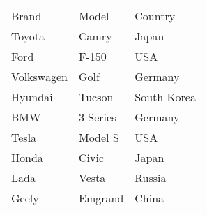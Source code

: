 \documentclass{article}
\begin{document}
\begin{tabular}{lll}
    Brand & Model & Country \\
    Toyota & Camry & Japan \\
    Ford & F-150 & USA \\
    Volkswagen & Golf & Germany \\
    Hyundai & Tucson & South Korea \\
    BMW & 3 Series & Germany \\
    Tesla & Model S & USA \\
    Honda & Civic & Japan \\
    Lada & Vesta & Russia \\
    Geely & Emgrand & China \\
\end{tabular}
\end{document}
